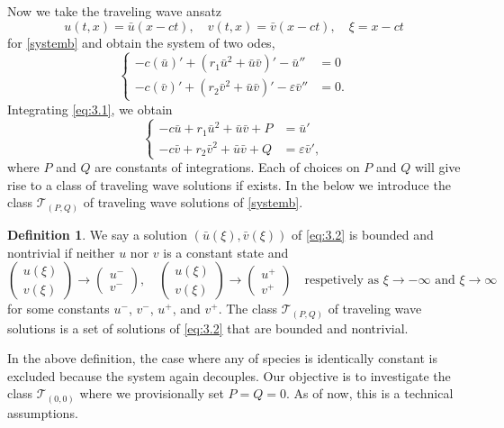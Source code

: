 \documentclass{amsart}
\theoremstyle{definition}
\newtheorem{defn}[thm1]{Definition}
\numberwithin{equation}{section}
\begin{document}
Now we take the traveling wave ansatz 
$$u(t,x) = \bar{u}(x-ct), \quad v(t,x) = \bar{v}(x-ct), \quad \xi = x-ct$$ for \eqref{systemb} and obtain the system of two odes,
\begin{equation}\label{eq:3.1}
\begin{cases}
-c(\bar{u})' + ( r_{1}\bar{u}^{2} + \bar{u}  \bar{v} )'- \bar{u}'' &= 0 \\
-c(\bar{v})' + ( r_{2}\bar{v}^{2} + \bar{u}  \bar{v} )' - \varepsilon\bar{v}'' &=  0.
\end{cases}
\end{equation}
Integrating \eqref{eq:3.1}, we obtain
\begin{equation}\label{eq:3.2}
\begin{cases}
-c\bar{u} + r_{1}\bar{u}^{2} + \bar{u}  \bar{v} + P &= \bar{u}' \\
-c\bar{v} + r_{2}\bar{v}^{2} + \bar{u}  \bar{v} + Q &= \varepsilon\bar{v}',
\end{cases}
\end{equation}
where $P$ and $Q$ are constants of integrations. Each of choices on $P$ and $Q$ will give rise to a class of traveling wave solutions if exists. In the below we introduce the class $\mathcal{T}_{(P,Q)}$ of traveling wave solutions of \eqref{systemb}.

\begin{defn} \label{nontrivial} We say a solution $(\bar{u}(\xi),\bar{v}(\xi))$ of \eqref{eq:3.2} is  bounded and  nontrivial if neither $u$ nor $v$ is a constant state and
$$ \begin{pmatrix} u(\xi) \\ v(\xi) \end{pmatrix} \rightarrow \begin{pmatrix} u^- \\ v^- \end{pmatrix}, \quad \begin{pmatrix} u(\xi) \\ v(\xi) \end{pmatrix} \rightarrow \begin{pmatrix} u^+ \\ v^+ \end{pmatrix} \quad \text{respetively as $\xi \rightarrow -\infty$ and $\xi \rightarrow \infty$}$$
 for some constants $u^-$, $v^-$, $u^+$, and $v^+$. The class $\mathcal{T}_{(P,Q)}$ of traveling wave solutions is a set of solutions of \eqref{eq:3.2} that are bounded and nontrivial. 
\end{defn}
In the above definition, the case where any of species is identically constant is excluded because the system again decouples. Our objective is to investigate the class $\mathcal{T}_{(0,0)}$ where we provisionally set $P=Q=0$. As of now, this is a technical assumptions.
\end{document}
